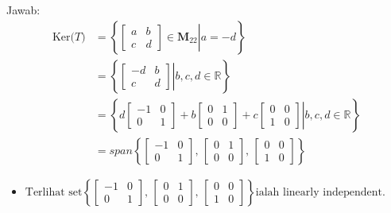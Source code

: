 \documentclass[12pt, a4paper]{scrartcl}
\begin{document}
\begin{enumerate}
\begin{enumerate}
            Jawab:
            \begin{align*}
                \mbox{Ker($T$)} &= \left\{ \left. \begin{bmatrix}
                    a&b\\c&d
                \end{bmatrix} \in \textbf{M}_{22} \right| a=-d \right\}
                \\
                &= \left\{\left.\begin{bmatrix}
                    -d&b\\c&d
                \end{bmatrix}\right|b, c, d \in \mathbb{R}\right\}
                \\
                &= \left\{\left. d \begin{bmatrix}
                    -1&0\\0&1
                \end{bmatrix}+b\begin{bmatrix}
                    0&1\\0&0
                \end{bmatrix}+c\begin{bmatrix}
                    0&0\\1&0
                \end{bmatrix}\right|b, c, d \in \mathbb{R}\right\}
                \\
                &= span\left\{\begin{bmatrix}
                    -1&0\\0&1
                \end{bmatrix}\mbox{, }\begin{bmatrix}
                    0&1\\0&0
                \end{bmatrix}\mbox{, }\begin{bmatrix}
                    0&0\\1&0
                \end{bmatrix}\right\}
            \end{align*}
            \begin{itemize}
                \item[] $\mbox{Terlihat set}\left\{\begin{bmatrix}
                    -1&0\\0&1
                \end{bmatrix}\mbox{, }\begin{bmatrix}
                    0&1\\0&0
                \end{bmatrix}\mbox{, }\begin{bmatrix}
                    0&0\\1&0
                \end{bmatrix}\right\} \mbox{ialah linearly independent.}$
            \end{itemize}


\end{enumerate}
\end{enumerate}
\end{document}
